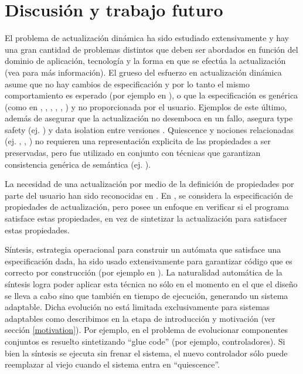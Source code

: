 \section{Discusión y trabajo futuro}

El problema de actualización dinámica ha sido estudiado extensivamente y hay una gran cantidad de problemas distintos
que deben ser abordados en función del dominio de aplicación, tecnología y la forma en que se efectúa la actualización
(vea \cite{SMR:SMR1556} para más información). El grueso del esfuerzo en actualización dinámica asume que no hay cambios
de especificación y por lo tanto el mismo comportamiento es esperado (por ejemplo en \cite{mx:icse13}), o que la
especificación es genérica (como en \cite{Shen:2005:TUF:1095430.1081720}, \cite{5551162}, \cite{1167829},
\cite{4221625}, \cite{485222}, \cite{60317}) y no proporcionada por el usuario. Ejemplos de este último, además de
asegurar que la actualización no desemboca en un fallo, asegura type safety (ej. \cite{Subramanian08dynamicsoftware}) y
data isolation entre versiones \cite{Stoyle07mutatismutandis:}. Quiescence \cite{60317} y nociones relacionadas (ej.
\cite{4359466},  \cite{Anderson:2009:MPM:1656437.1656448}, \cite{485222}) no requieren una representación explicita de
las propiedades a ser preservadas, pero fue utilizado en conjunto con técnicas que garantizan consistencia genérica de
semántica (ej. \cite{5546542}). 

La necesidad de una actualización por medio de la definición de propiedades por parte del usuario han sido reconocidas
en \cite{Baresi:2010:DBD:1882362.1882367}. En \cite{Hayden:2012:SVC:2189314.2189336}, se considera la especificación de
propiedades de actualización, pero posee un enfoque en verificar si el programa satisface estas propiedades, en vez de
sintetizar la actualización para satisfacer estas propiedades. 

Síntesis, estrategia operacional para construir un autómata que satisface una especificación dada, ha sido usado
extensivamente para garantizar código que es correcto por construcción (por ejemplo en
\cite{Greenyer:2013:ISC:2491411.2491445}). La naturalidad automática de la síntesis logra poder aplicar esta técnica no
sólo en el momento en el que el diseño se lleva a cabo sino que también en tiempo de ejecución, generando un sistema
adaptable. Dicha evolución no está limitada exclusivamente para sistemas adaptables como describimos en la etapa de
introducción y motivación (ver sección \ref{motivation}). Por ejemplo, en \cite{Pelliccione20082237} el problema de
evolucionar componentes conjuntos es resuelto sintetizando ``glue code'' (por ejemplo, controladores). Si bien la
síntesis se ejecuta sin frenar el sistema, el nuevo controlador sólo puede reemplazar al viejo cuando el sistema entra
en ``quiescence''.


